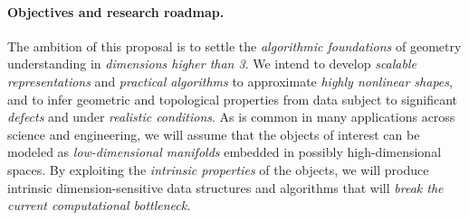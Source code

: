 \paragraph{Objectives and research roadmap.}
The ambition of this proposal is to settle the {\em algorithmic
foundations} of geometry understanding in {\em dimensions higher than
3}.  We intend to develop {\em scalable representations} and {\em
practical algorithms} to approximate {\em highly nonlinear shapes}, and to
infer geometric and topological properties from data subject to
significant {\em defects} and under {\em realistic conditions}.
As is common in many applications across science and engineering, we
will assume that the objects of interest can be modeled as {\em
  low-dimensional manifolds} embedded in possibly high-dimensional
spaces. By exploiting the {\em intrinsic properties} of the objects,
we will produce intrinsic dimension-sensitive data structures and algorithms
that will {\em break the current computational
bottleneck.}  %

